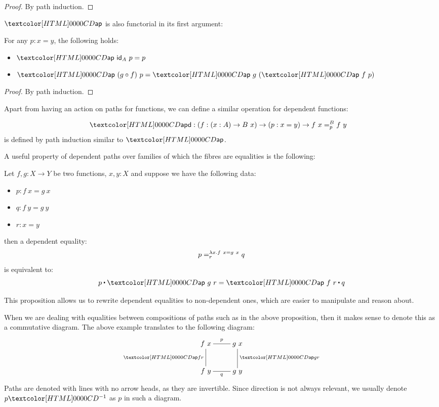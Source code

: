 \begin{proof}
  By path induction.
\end{proof}

$\ap$ is also functorial in its first argument:

\begin{proposition}
  For any $p : x = y$, the following holds:
  \begin{itemize}
  \item $\ap\ \id_A\ p = p$
  \item $\ap\ (g \circ f)\ p = \ap\ g\ (\ap\ f\ p)$
  \end{itemize}
\end{proposition}

\begin{proof}
  By path induction.
\end{proof}

Apart from having an action on paths for functions, we can define a
similar operation for dependent functions:

\begin{definition}
  \begin{align*}
    &\apd : (f : (x : A) \to B\ x) \to (p : x = y) \to \pathover{B}{p}{f\ x}{f\ y}
  \end{align*}
  is defined by path induction similar to $\ap$.
\end{definition}

A useful property of dependent paths over families of which the fibres
are equalities is the following:

\begin{proposition}
  Let $f, g : X \to Y$ be two functions, $x, y : X$ and suppose we
  have the following data:
  \begin{itemize}
  \item $p : f\ x = g\ x$
  \item $q : f\ y = g\ y$
  \item $r : x = y$
  \end{itemize}
  then a dependent equality:
  $$
  \pathover{\lambda x . f\ x = g\ x}{r}{p}{q}
  $$
  is equivalent to:
  $$
  p \ct \ap\ g\ r = \ap\ f\ r \ct q
  $$
\end{proposition}

This proposition allows us to rewrite dependent equalities to
non-dependent ones, which are easier to manipulate and reason about.

\begin{remark}
  When we are dealing with equalities between compositions of paths
  such as in the above proposition, then it makes sense to denote this
  as a commutative diagram. The above example translates to the
  following diagram:
  $$
  \xymatrix{
    f\ x 
    \ar@{-}[r]^{p}
    \ar@{-}[d]_{\ap f r}
    &g\ x
    \ar@{-}[d]^{\ap g r}
    \\
    f\ y
    \ar@{-}[r]_{q}
    &g\ y
  }
  $$
  Paths are denoted with lines with no arrow heads, as they are
  invertible. Since direction is not always relevant, we usually
  denote $\sym{p}$ as $p$ in such a diagram.
\end{remark}

